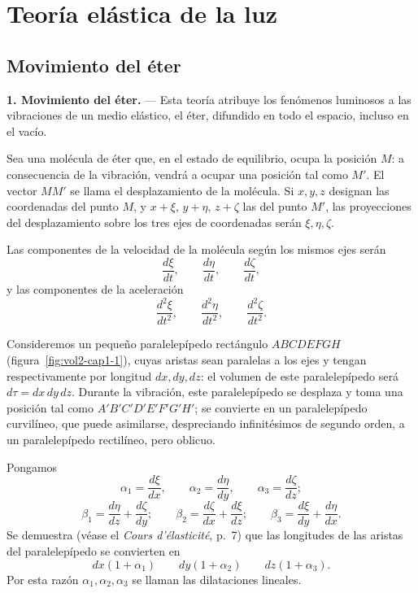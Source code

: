 \chapter{Teoría elástica de la luz}
\label{cap:vol2-elastica}

\section{Movimiento del éter}

\noindent\textbf{1. Movimiento del éter.} — Esta teoría atribuye los
fenómenos luminosos a las vibraciones de un medio elástico, el éter,
difundido en todo el espacio, incluso en el vacío.

Sea una molécula de éter que, en el estado de equilibrio, ocupa la
posición $M$: a consecuencia de la vibración, vendrá a ocupar una posición
tal como $M'$. El vector $MM'$ se llama el desplazamiento de la molécula.
Si $x,y,z$ designan las coordenadas del punto $M$, y $x+\xi,\,y+\eta,\,z+\zeta$
las del punto $M'$, las proyecciones del desplazamiento sobre los tres ejes
de coordenadas serán $\xi,\eta,\zeta$.

Las componentes de la velocidad de la molécula según los mismos ejes serán
\[
\frac{d\xi}{dt},\qquad \frac{d\eta}{dt},\qquad \frac{d\zeta}{dt},
\]
y las componentes de la aceleración
\[
\frac{d^2\xi}{dt^2},\qquad \frac{d^2\eta}{dt^2},\qquad \frac{d^2\zeta}{dt^2}.
\]

Consideremos un pequeño paralelepípedo rectángulo $ABCDEFGH$
(figura~\ref{fig:vol2-cap1-1}), cuyas aristas sean paralelas a los ejes y tengan
respectivamente por longitud $dx,dy,dz$: el volumen de este paralelepípedo
será $d\tau=dx\,dy\,dz$. Durante la vibración, este paralelepípedo se
desplaza y toma una posición tal como $A'B'C'D'E'F'G'H'$; se convierte en
un paralelepípedo curvilíneo, que puede asimilarse, despreciando
infinitésimos de segundo orden, a un paralelepípedo rectilíneo, pero
oblicuo.

Pongamos
\[
\alpha_1=\frac{d\xi}{dx},\qquad \alpha_2=\frac{d\eta}{dy},\qquad \alpha_3=\frac{d\zeta}{dz};
\]
\[
\beta_1=\frac{d\eta}{dz}+\frac{d\zeta}{dy};\qquad
\beta_2=\frac{d\zeta}{dx}+\frac{d\xi}{dz};\qquad
\beta_3=\frac{d\xi}{dy}+\frac{d\eta}{dx}.
\]
Se demuestra (véase el \emph{Cours d'élasticité}, p.~7) que las longitudes
de las aristas del paralelepípedo se convierten en
\[
dx(1+\alpha_1)\qquad dy(1+\alpha_2)\qquad dz(1+\alpha_3).
\]
Por esta razón $\alpha_1,\alpha_2,\alpha_3$ se llaman las dilataciones
lineales.

